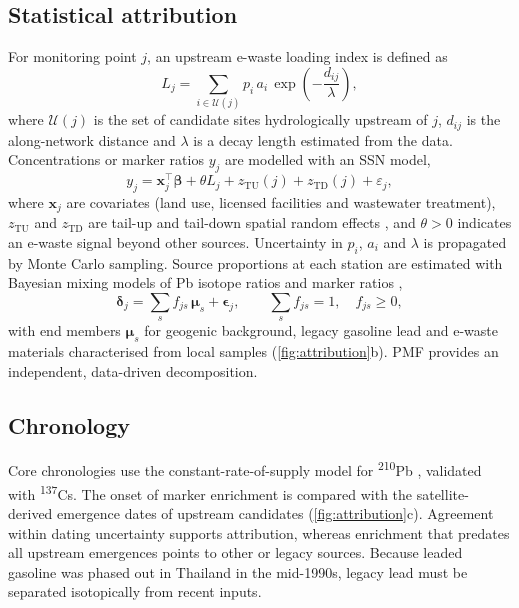 \documentclass[10pt]{article}
\begin{document}
\subsection{Statistical attribution}
For monitoring point $j$, an upstream e-waste loading index is defined as
\begin{equation}
L_j=\sum_{i\in\mathcal{U}(j)}p_i\,a_i\,\exp\!\left(-\frac{d_{ij}}{\lambda}\right),
\label{eq:load}
\end{equation}
where $\mathcal{U}(j)$ is the set of candidate sites hydrologically upstream of $j$, $d_{ij}$ is the along-network distance and $\lambda$ is a decay length estimated from the data. Concentrations or marker ratios $y_j$ are modelled with an SSN model,
\begin{equation}
y_j=\mathbf{x}_j^{\top}\bm{\beta}+\theta L_j+z_{\mathrm{TU}}(j)+z_{\mathrm{TD}}(j)+\varepsilon_j,
\label{eq:ssn}
\end{equation}
where $\mathbf{x}_j$ are covariates (land use, licensed facilities and wastewater treatment), $z_{\mathrm{TU}}$ and $z_{\mathrm{TD}}$ are tail-up and tail-down spatial random effects \citep{verhoef2010}, and $\theta>0$ indicates an e-waste signal beyond other sources. Uncertainty in $p_i$, $a_i$ and $\lambda$ is propagated by Monte Carlo sampling. Source proportions at each station are estimated with Bayesian mixing models of Pb isotope ratios and marker ratios \citep{stock2018},
\begin{equation}
\bm{\delta}_j=\sum_{s}f_{js}\,\bm{\mu}_s+\bm{\epsilon}_j,\qquad\sum_s f_{js}=1,\quad f_{js}\ge 0,
\label{eq:mix}
\end{equation}
with end members $\bm{\mu}_s$ for geogenic background, legacy gasoline lead and e-waste materials characterised from local samples (\cref{fig:attribution}b). PMF \citep{paatero1994,norris2014} provides an independent, data-driven decomposition.

\subsection{Chronology}
Core chronologies use the constant-rate-of-supply model for \textsuperscript{210}Pb \citep{appleby1978}, validated with \textsuperscript{137}Cs. The onset of marker enrichment is compared with the satellite-derived emergence dates of upstream candidates (\cref{fig:attribution}c). Agreement within dating uncertainty supports attribution, whereas enrichment that predates all upstream emergences points to other or legacy sources. Because leaded gasoline was phased out in Thailand in the mid-1990s, legacy lead must be separated isotopically from recent inputs.
\end{document}
